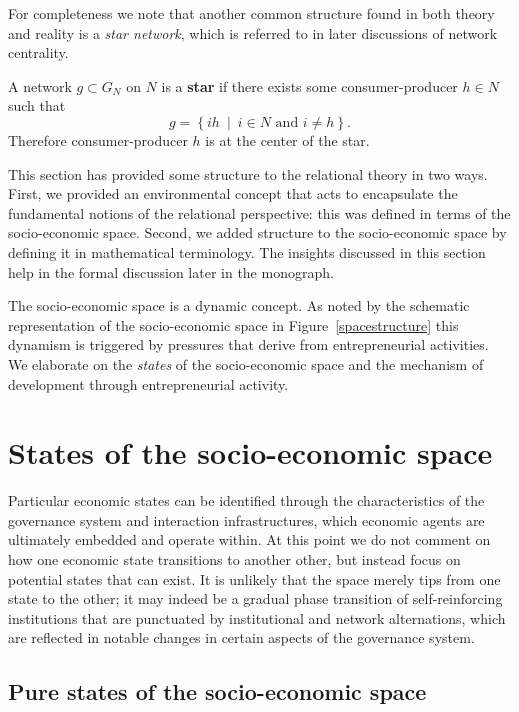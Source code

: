 For completeness we note that another common structure found in both theory and reality is a \emph{star network}, which is referred to in later discussions of network centrality.
\begin{definition} \label{def:starNetwork}
A network $g \subset G_{N}$ on $N$ is a \textbf{star} if there exists some consumer-producer $h \in N$ such that
\begin{equation}
g = \left\{ ih ~ \mid ~ i \in N \mbox{ and } i \neq h \right\}.
\end{equation}
Therefore consumer-producer $h$ is at the center of the star.
\end{definition}
This section has provided some structure to the relational theory in two ways. First, we provided an environmental concept that acts to encapsulate the fundamental notions of the relational perspective: this was defined in terms of the socio-economic space. Second, we added structure to the socio-economic space by defining it in mathematical terminology. The insights discussed in this section help in the formal discussion later in the monograph.

The socio-economic space is a dynamic concept. As noted by the schematic representation of the socio-economic space in Figure~\ref{spacestructure} this dynamism is triggered by pressures that derive from entrepreneurial activities. We elaborate on the \emph{states} of the socio-economic space and the mechanism of development through entrepreneurial activity.

\section{States of the socio-economic space}
\label{sec:StatesOfTheSocioEconomicSpace}

Particular economic states can be identified through the characteristics of the governance system and interaction infrastructures, which economic agents are ultimately embedded and operate within. At this point we do not comment on how one economic state transitions to another other, but instead focus on potential states that can exist. It is unlikely that the space merely tips from one state to the other; it may indeed be a gradual phase transition of self-reinforcing institutions that are punctuated by institutional and network alternations, which are reflected in notable changes in certain aspects of the governance system.

\subsection{Pure states of the socio-economic space}

